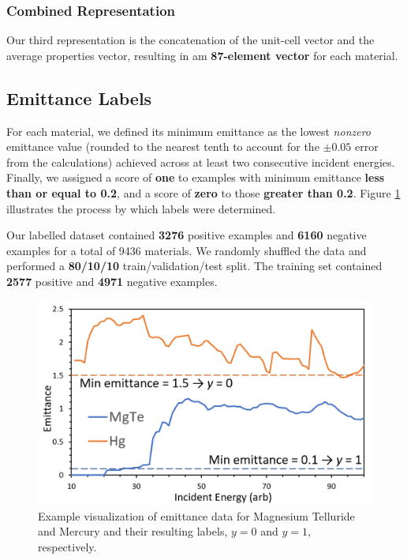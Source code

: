 \documentclass[10pt,twocolumn,letterpaper]{article}
\begin{document}
\subsubsection{Combined Representation}
Our third representation is the concatenation of the unit-cell vector and the average properties vector, resulting in am \textbf{87-element vector} for each material.

\subsection{Emittance Labels}

For each material, we defined its minimum emittance as the lowest \textit{nonzero} emittance value (rounded to the nearest tenth to account for the $\pm0.05$ error from the calculations) achieved across at least two consecutive incident energies. Finally, we assigned a score of \textbf{one} to examples with minimum emittance \textbf{less than or equal to 0.2}, and a score of \textbf{zero} to those \textbf{greater than 0.2}. Figure \ref{fig:emittance-calc} illustrates the process by which labels were determined.

Our labelled dataset contained \textbf{3276} positive examples and \textbf{6160} negative examples for a total of 9436 materials. We randomly shuffled the data and performed a \textbf{80/10/10} train/validation/test split. The training set contained \textbf{2577} positive and \textbf{4971} negative examples.

\begin{figure}[ht]
\centering
\includegraphics[width=\linewidth]{../images/emittance-plots.PNG}
\caption{Example visualization of emittance data for Magnesium Telluride and Mercury and their resulting labels, $y = 0$ and $y = 1$, respectively.}
\label{fig:emittance-calc}
\end{figure}
\end{document}
